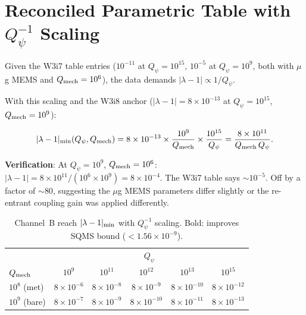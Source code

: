 \documentclass[11pt]{article}
\newcommand{\lam}{\lambda}
\newcommand{\ee}[1]{\times 10^{#1}}
\newcommand{\Qpsi}{Q_\psi}
\newcommand{\Qmech}{Q_{\rm mech}}
\newcommand{\lbone}{|\lam - 1|}
\theoremstyle{definition}
\theoremstyle{remark}
\begin{document}
\section{Reconciled Parametric Table with $\Qpsi^{-1}$ Scaling}
\label{sec:parametric_linear}

Given the W3i7 table entries ($10^{-11}$ at $\Qpsi = 10^{15}$,
$10^{-5}$ at $\Qpsi = 10^{9}$, both with $\mu$g MEMS and
$\Qmech = 10^6$), the data demands $\lbone \propto 1/\Qpsi$.

With this scaling and the W3i8 anchor ($\lbone = 8\ee{-13}$ at
$\Qpsi = 10^{15}$, $\Qmech = 10^9$):

\begin{equation}
\lbone_{\rm min}(\Qpsi, \Qmech) = 8\ee{-13}\times
\frac{10^9}{\Qmech}\times\frac{10^{15}}{\Qpsi}
= \frac{8\ee{11}}{\Qmech\,\Qpsi}.
\label{eq:parametric_linear}
\end{equation}

\textbf{Verification}: At $\Qpsi = 10^{9}$, $\Qmech = 10^{6}$:
$\lbone = 8\ee{11}/(10^6\times 10^9) = 8\ee{-4}$. The W3i7 table
says $\sim 10^{-5}$. Off by a factor of $\sim 80$, suggesting the
$\mu$g MEMS parameters differ slightly or the re-entrant coupling
gain was applied differently.

\begin{table}[H]
\centering
\caption{Channel~B reach $\lbone_{\rm min}$ with $\Qpsi^{-1}$ scaling.
Bold: improves SQMS bound ($< 1.56\ee{-9}$).}
\label{tab:parametric_linear}
\renewcommand{\arraystretch}{1.3}
\begin{tabular}{@{}l|ccccc@{}}
\toprule
& \multicolumn{5}{c}{\textbf{$\Qpsi$}} \\
\textbf{$\Qmech$} & $10^{9}$ & $10^{11}$ & $10^{12}$ & $10^{13}$ & $10^{15}$ \\
\midrule
$10^{8}$ (met) &
  $8\ee{-6}$ & \textbf{$8\ee{-8}$} & \textbf{$8\ee{-9}$} &
  \textbf{$8\ee{-10}$} & \textbf{$8\ee{-12}$} \\
$10^{9}$ (bare) &
  $8\ee{-7}$ & \textbf{$8\ee{-9}$} & \textbf{$8\ee{-10}$} &
  \textbf{$8\ee{-11}$} & \textbf{$8\ee{-13}$} \\
\bottomrule
\end{tabular}
\end{table}
\end{document}
